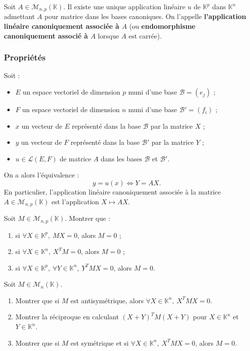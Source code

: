 \documentclass[french]{article}
\newcommand{\K}{\mathbb{K}}
\theoremstyle{plain}
\theoremstyle{definition}
\theoremstyle{remark}
\begin{document}
Soit $A\in\mathcal{M}_{n,p}(\K)$. Il existe une unique application linéaire $u$ de $\K^p$ dans $\K^n$ admettant $A$ pour matrice dans les bases canoniques. On l'appelle \textbf{l'application linéaire canoniquement associée à $A$} (ou \textbf{endomorphisme canoniquement associé à $A$} lorsque $A$ est carrée).

\subsubsection*{Propriétés}

Soit :
\begin{itemize}
	\item $E$ un espace vectoriel de dimension $p$ muni d'une base $\mathcal{B}=(e_j)$ ;
	\item $F$ un espace vectoriel de dimension $n$ muni d'une base $\mathcal{B}'=(f_i)$ ;
	\item $x$ un vecteur de $E$ représenté dans la base $\mathcal{B}$ par la matrice $X$ ;
	\item $y$ un vecteur de $F$ représenté dans la base $\mathcal{B}'$ par la matrice $Y$ ;
	\item $u\in\mathcal{L}(E,F)$ de matrice $A$ dans les bases $\mathcal{B}$ et $\mathcal{B}'$.
\end{itemize}
On a alors l'équivalence :
$$y=u(x)\iff Y=AX.$$
En particulier, l'application linéaire canoniquement associée à la matrice $A\in\mathcal{M}_{n,p}(\K)$ est l'application $X\mapsto AX$.

\begin{exo}
	Soit $M\in\mathcal{M}_{n,p}(\K)$. Montrer que :
	\begin{enumerate}
		\item si $\forall X\in\K^p,\ MX=0$, alors $M=0$ ; %
		\item si $\forall X\in\K^n,\ X^TM=0$, alors $M=0$ ; %
		\item si $\forall X\in\K^p,\ \forall Y\in\K^n,\ Y^TMX=0$, alors $M=0$. %
	\end{enumerate}
\end{exo}

\begin{exo}
	Soit $M\in\mathcal{M}_n(\K)$.
	\begin{enumerate}
		\item Montrer que si $M$ est antisymétrique, alors $\forall X\in\K^n,\ X^TMX=0$.
		\item Montrer la réciproque en calculant $(X+Y)^TM(X+Y)$ pour $X\in\K^n$ et $Y\in\K^n$.
		\item Montrer que si $M$ est symétrique et si $\forall X\in\K^n,\ X^TMX=0$, alors $M=0$.
	\end{enumerate}
\end{exo}
\end{document}

